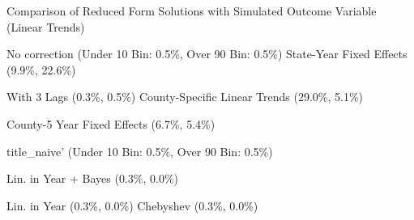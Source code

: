 \caption{Comparison of Reduced Form Solutions with Simulated Outcome Variable (Linear Trends) \label{fig:distributions-existing-solutions}}
\caption*{\color{p1line}{\textbf{\textemdash\textemdash}} No correction (Under 10 Bin: 0.5\%, Over 90 Bin: 0.5\%) \hspace{1cm} \color{p2line}{- - -} State-Year Fixed Effects (9.9\%, 22.6\%)}
\caption*{\color{p3line}{\textbf{- - -}} With 3 Lags (0.3\%, 0.5\%) \hspace{1cm} \color{p4line}{\textbf{- - -}} County-Specific Linear Trends (29.0\%, 5.1\%)}
\caption*{\color{p5line}{\textbf{- - -}} County-5 Year Fixed Effects (6.7\%, 5.4\%)}


\caption*{\color{p1line}{\textbf{\textemdash\textemdash}} title_naive' (Under 10 Bin: 0.5\%, Over 90 Bin: 0.5\%)}
\caption*{\color{p2line}{\textbf{- - -}} Lin. in Year + Bayes (0.3\%, 0.0\%)}
\caption*{\color{p3line}{\textbf{- - -}} Lin. in Year (0.3\%, 0.0\%) \hspace{1cm} \color{p4line}{\textbf{- - -}} Chebyshev (0.3\%, 0.0\%)}